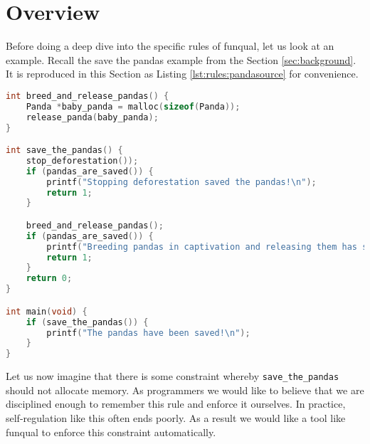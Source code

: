 \section{Overview}\label{sec:rules:overview}

Before doing a deep dive into the specific rules of funqual, let us look at an example.  Recall the save the pandas example from the Section \ref{sec:background}.  It is reproduced in this Section as Listing \ref{lst:rules:pandasource} for convenience.  

\noindent\begin{minipage}[t]{\linewidth}
\begin{lstlisting}[language=C,caption={Example C program.  Running this code in a production environment may not actually save the pandas},label={lst:rules:pandasource}]
int breed_and_release_pandas() {
    Panda *baby_panda = malloc(sizeof(Panda));
    release_panda(baby_panda);
}

int save_the_pandas() {
	stop_deforestation());
	if (pandas_are_saved()) {
		printf("Stopping deforestation saved the pandas!\n");
		return 1;
	}

	breed_and_release_pandas();
	if (pandas_are_saved()) {
		printf("Breeding pandas in captivation and releasing them has saved the pandas!\n");
		return 1;
	}
	return 0;
}

int main(void) {
	if (save_the_pandas()) {
		printf("The pandas have been saved!\n");
	}
}
\end{lstlisting}
\end{minipage}

Let us now imagine that there is some constraint whereby \lstinline{save_the_pandas} should not allocate memory. As programmers we would like to believe that we are disciplined enough to remember this rule and enforce it ourselves. In practice, self-regulation like this often ends poorly. As a result we would like a tool like funqual to enforce this constraint automatically.

